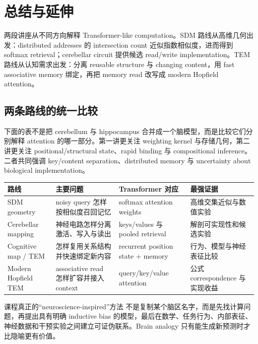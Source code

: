 \section{总结与延伸}

两段讲座从不同方向解释 Transformer-like computation。SDM 路线从高维几何出发：distributed addresses 的 intersection count 近似指数相似度，进而得到 softmax retrieval；cerebellar circuit 提供候选 read/write implementation。TEM 路线从认知需求出发：分离 reusable structure 与 changing content，用 fast associative memory 绑定，再把 memory read 改写成 modern Hopfield attention。

\subsection{两条路线的统一比较}

下面的表不是把 cerebellum 与 hippocampus 合并成一个脑模型，而是比较它们分别解释 attention 的哪一部分。第一讲更关注 weighting kernel 与存储几何，第二讲更关注 positional/structural state、rapid binding 与 compositional inference。二者共同强调 key/content separation、distributed memory 与 uncertainty about biological implementation。

\begin{longtable}{@{}L{0.18\textwidth}L{0.24\textwidth}L{0.25\textwidth}L{0.21\textwidth}@{}}
\toprule
路线 & 主要问题 & Transformer 对应 & 最强证据 \\
\midrule
SDM geometry & noisy query 怎样按相似度召回记忆 & softmax attention weights & 高维交集近似与数值实验 \\
Cerebellar mapping & 神经电路怎样分离激活、写入与读出 & keys/values 与 pooled retrieval & 解剖可实现性和候选实验 \\
Cognitive map / TEM & 怎样复用关系结构并快速绑定新内容 & recurrent position state + memory & 行为、模型与神经表征比较 \\
Modern Hopfield TEM & associative read 怎样扩容并接入 context & query/key/value attention & 公式 correspondence 与实现收益 \\
\bottomrule
\end{longtable}

\begin{importantbox}{课程真正的“neuroscience-inspired”方法}
不是复制某个脑区名字，而是先找计算问题，再提出具有明确 inductive bias 的模型，最后在数学、任务行为、内部表征、神经数据和干预实验之间建立可证伪联系。Brain analogy 只有能生成新预测时才比隐喻更有价值。
\end{importantbox}

